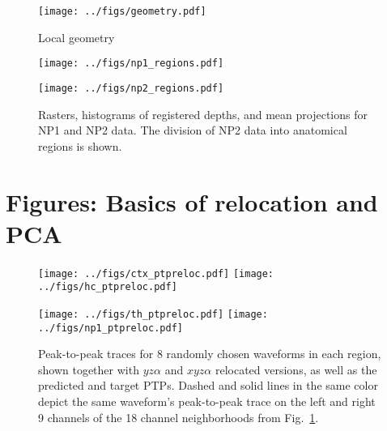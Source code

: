 \documentclass[
  12pt,
]{article}
\theoremstyle{plain}
\theoremstyle{definition}
\theoremstyle{remark}
\newcommand{\1}[1]{\mathbb{1}_{{#1}}}
\begin{document}
\begin{figure}[hbtp]
\begin{center}
\texttt{[image: ../figs/geometry.pdf]}
\end{center}
\caption{Local geometry}
\label{fig:geom}
\end{figure}

\begin{figure}
\begin{center}
\texttt{[image: ../figs/np1\_regions.pdf]}

\vspace{-10pt}

\texttt{[image: ../figs/np2\_regions.pdf]}
\end{center}
\caption{Rasters, histograms of registered depths, and mean projections for NP1 and NP2 data. The division of NP2 data into anatomical regions is shown.}
\label{fig:anat}
\end{figure}

\FloatBarrier
\newpage

\section{Figures: Basics of relocation and PCA}

\begin{figure}[H]
\begin{adjustwidth*}{-1.6in}{-1.6in}
\begin{center}

\texttt{[image: ../figs/ctx\_ptpreloc.pdf]}
\texttt{[image: ../figs/hc\_ptpreloc.pdf]}

\bigskip


\texttt{[image: ../figs/th\_ptpreloc.pdf]}
\texttt{[image: ../figs/np1\_ptpreloc.pdf]}
\end{center}
\end{adjustwidth*}
\caption{Peak-to-peak traces for 8 randomly chosen waveforms in each region, shown together with $yz\alpha$ and $xyz\alpha$ relocated versions, as well as the predicted and target PTPs. Dashed and solid lines in the same color depict the same waveform's peak-to-peak trace on the left and right 9 channels of the 18 channel neighborhoods from Fig.~\ref{fig:geom}.}
\label{fig:ptps}
\end{figure}
\end{document}

